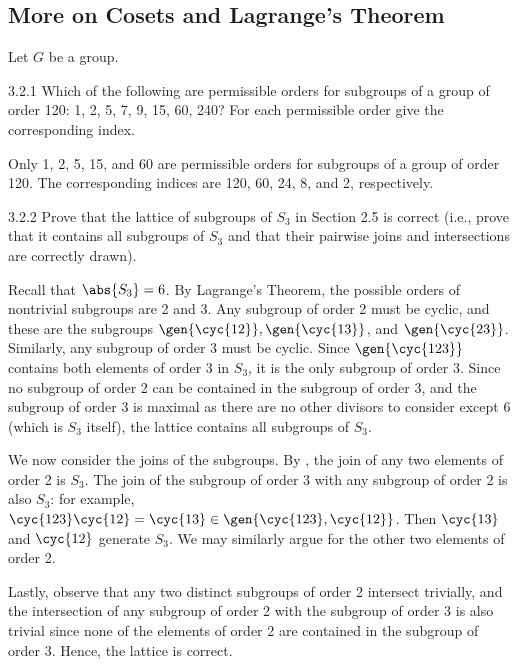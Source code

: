 \subsection{More on Cosets and Lagrange's Theorem}

Let $G$ be a group.

\begin{exercise}{3.2.1}
    Which of the following are permissible orders for subgroups of a group of order 120: 1, 2, 5, 7, 9, 15, 60, 240?
	For each permissible order give the corresponding index.
\end{exercise}

\begin{sol}
    Only 1, 2, 5, 15, and 60 are permissible orders for subgroups of a group of order 120.
	The corresponding indices are 120, 60, 24, 8, and 2, respectively.
\end{sol}

\begin{exercise}{3.2.2}
    Prove that the lattice of subgroups of $S_3$ in Section 2.5 is correct (i.e., prove that it contains all subgroups of $S_3$ and that their pairwise joins and intersections are correctly drawn).
\end{exercise}
\begin{sol}
    Recall that $\abs{S_3} = 6$.
	By Lagrange's Theorem, the possible orders of nontrivial subgroups are 2 and 3.
	Any subgroup of order 2 must be cyclic, and these are the subgroups $\gen{\cyc{1 2}}, \gen{\cyc{1 3}}$, and $\gen{\cyc{2 3}}$.
	Similarly, any subgroup of order 3 must be cyclic.
	Since $\gen{\cyc{1 2 3}}$ contains both elements of order 3 in $S_3$, it is the only subgroup of order 3.
	Since no subgroup of order 2 can be contained in the subgroup of order 3, and the subgroup of order 3 is maximal as there are no other divisors to consider except 6 (which is $S_3$ itself), the lattice contains all subgroups of $S_3$.

    We now consider the joins of the subgroups.
	By , the join of any two elements of order 2 is $S_3$.
	The join of the subgroup of order 3 with any subgroup of order 2 is also $S_3$: for example, $\cyc{1 2 3}\cyc{1 2} = \cyc{1 3} \in \gen{\cyc{1 2 3}, \cyc{1 2}}$.
	Then $\cyc{1 3}$ and $\cyc{1 2}$ generate $S_3$.
	We may similarly argue for the other two elements of order 2.

    Lastly, observe that any two distinct subgroups of order 2 intersect trivially, and the intersection of any subgroup of order 2 with the subgroup of order 3 is also trivial since none of the elements of order 2 are contained in the subgroup of order 3.
	Hence, the lattice is correct.
\end{sol}


